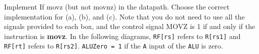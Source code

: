 \begin{blocksection}

\question
Implement \text If {movz} (but not movnz) in the datapath. Choose the correct implementation for (a), (b), and (c). Note that you do not need to use all the signals provided to each box, and the control signal MOVZ is 1 if and only if the instruction is \textbf{movz}. In the following diagrams, \texttt{RF[rs]} refers to \texttt{R[rs1]} and \texttt{RF[rt]} refers to \texttt{R[rs2]}. \texttt{ALUZero = 1} if the \texttt{A} input of the \texttt{ALU} is zero.


\end{blocksection}